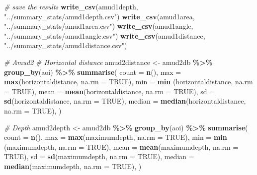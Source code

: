 \documentclass[
]{article}
\newenvironment{Shaded}{\begin{snugshade}}{\end{snugshade}}
\newcommand{\AttributeTok}[1]{\textcolor[rgb]{0.13,0.29,0.53}{#1}}
\newcommand{\CommentTok}[1]{\textcolor[rgb]{0.56,0.35,0.01}{\textit{#1}}}
\newcommand{\ConstantTok}[1]{\textcolor[rgb]{0.56,0.35,0.01}{#1}}
\newcommand{\FunctionTok}[1]{\textcolor[rgb]{0.13,0.29,0.53}{\textbf{#1}}}
\newcommand{\NormalTok}[1]{#1}
\newcommand{\OtherTok}[1]{\textcolor[rgb]{0.56,0.35,0.01}{#1}}
\newcommand{\SpecialCharTok}[1]{\textcolor[rgb]{0.81,0.36,0.00}{\textbf{#1}}}
\newcommand{\StringTok}[1]{\textcolor[rgb]{0.31,0.60,0.02}{#1}}
\begin{document}
\begin{Shaded}
\begin{Highlighting}[]
\CommentTok{\# save the results }
\FunctionTok{write\_csv}\NormalTok{(amud1depth, }\StringTok{"../summary\_stats/amud1depth.csv"}\NormalTok{)}
\FunctionTok{write\_csv}\NormalTok{(amud1area, }\StringTok{"../summary\_stats/amud1area.csv"}\NormalTok{)}
\FunctionTok{write\_csv}\NormalTok{(amud1angle, }\StringTok{"../summary\_stats/amud1angle.csv"}\NormalTok{)}
\FunctionTok{write\_csv}\NormalTok{(amud1distance, }\StringTok{"../summary\_stats/amud1distance.csv"}\NormalTok{)}

\CommentTok{\# Amud2}
\CommentTok{\# Horizontal distance}
\NormalTok{amud2distance }\OtherTok{\textless{}{-}}\NormalTok{ amud2db }\SpecialCharTok{\%\textgreater{}\%} \FunctionTok{group\_by}\NormalTok{(aoi) }\SpecialCharTok{\%\textgreater{}\%}
      \FunctionTok{summarise}\NormalTok{(}
      \AttributeTok{count =} \FunctionTok{n}\NormalTok{(),}
      \AttributeTok{max =} \FunctionTok{max}\NormalTok{(horizontaldistance, }\AttributeTok{na.rm =} \ConstantTok{TRUE}\NormalTok{),}
      \AttributeTok{min =} \FunctionTok{min}\NormalTok{ (horizontaldistance, }\AttributeTok{na.rm =} \ConstantTok{TRUE}\NormalTok{),}
      \AttributeTok{mean =} \FunctionTok{mean}\NormalTok{(horizontaldistance, }\AttributeTok{na.rm =} \ConstantTok{TRUE}\NormalTok{),}
      \AttributeTok{sd =} \FunctionTok{sd}\NormalTok{(horizontaldistance, }\AttributeTok{na.rm =} \ConstantTok{TRUE}\NormalTok{),}
      \AttributeTok{median =} \FunctionTok{median}\NormalTok{(horizontaldistance, }\AttributeTok{na.rm =} \ConstantTok{TRUE}\NormalTok{),}
\NormalTok{  ) }

\CommentTok{\# Depth}
\NormalTok{amud2depth }\OtherTok{\textless{}{-}}\NormalTok{ amud2db }\SpecialCharTok{\%\textgreater{}\%} \FunctionTok{group\_by}\NormalTok{(aoi) }\SpecialCharTok{\%\textgreater{}\%}
      \FunctionTok{summarise}\NormalTok{(}
      \AttributeTok{count =} \FunctionTok{n}\NormalTok{(),}
      \AttributeTok{max =} \FunctionTok{max}\NormalTok{(maximumdepth, }\AttributeTok{na.rm =} \ConstantTok{TRUE}\NormalTok{),}
      \AttributeTok{min =} \FunctionTok{min}\NormalTok{ (maximumdepth, }\AttributeTok{na.rm =} \ConstantTok{TRUE}\NormalTok{),}
      \AttributeTok{mean =} \FunctionTok{mean}\NormalTok{(maximumdepth, }\AttributeTok{na.rm =} \ConstantTok{TRUE}\NormalTok{),}
      \AttributeTok{sd =} \FunctionTok{sd}\NormalTok{(maximumdepth, }\AttributeTok{na.rm =} \ConstantTok{TRUE}\NormalTok{),}
      \AttributeTok{median =} \FunctionTok{median}\NormalTok{(maximumdepth, }\AttributeTok{na.rm =} \ConstantTok{TRUE}\NormalTok{),}
\NormalTok{  ) }


\end{Highlighting}
\end{Shaded}
\end{document}
